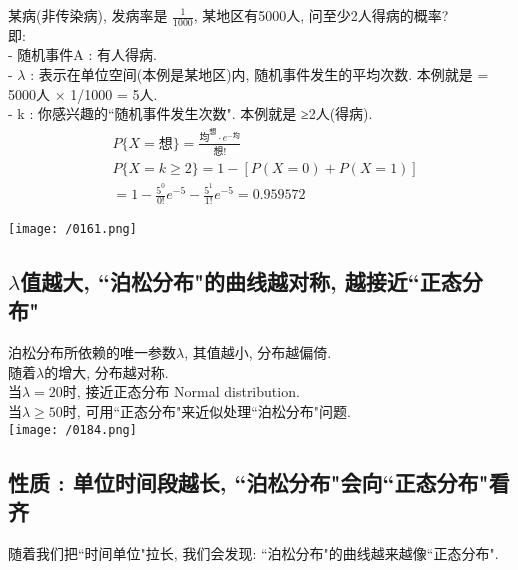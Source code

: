 \documentclass[UTF8]{ctexart}
\begin{document}
	
	
	
	\begin{myEnvSample}
		某病(非传染病), 发病率是 $\frac{1} {1000}$, 某地区有5000人, 问至少2人得病的概率? \\
		即: \\
		- 随机事件A : 有人得病. \\
		- $\lambda$ : 表示在单位空间(本例是某地区)内, 随机事件发生的平均次数. 本例就是 = 5000人 × 1/1000 = 5人. \\
		- k : 你感兴趣的``随机事件发生次数". 本例就是 ≥2人(得病).  		
		\begin{align*}  %
	&P\{X=\text{想\}}=\frac{\text{均}^{\text{想}}\cdot e^{-\text{均}}}{\text{想!}}\\
&P\{X=k\ge 2\}=1-\left[ P\left( X=0 \right) +P\left( X=1 \right) \right]\\
&=1-\frac{5^0}{0!}e^{-5}-\frac{5^1}{1!}e^{-5}=0.959572
		\end{align*}
	
	\texttt{[image: /0161.png]}
		
	\end{myEnvSample}
	
	
	
	
	
	
	
	\subsection{$\lambda$值越大, ``泊松分布"的曲线越对称, 越接近``正态分布"} 
	
	泊松分布所依赖的唯一参数$\lambda$, 其值越小, 分布越偏倚.  \\
	随着$\lambda$的增大, 分布越对称. \\
	当$\lambda=20$时, 接近正态分布 Normal distribution. \\
	当$\lambda \geq 50$时, 可用``正态分布"来近似处理``泊松分布"问题. \\
	
	\texttt{[image: /0184.png]} 
	
	
	
	
	\subsection{性质 : 单位时间段越长, ``泊松分布"会向``正态分布"看齐 }
	
	随着我们把``时间单位"拉长, 我们会发现: ``泊松分布"的曲线越来越像``正态分布". \\
	
\end{document}
